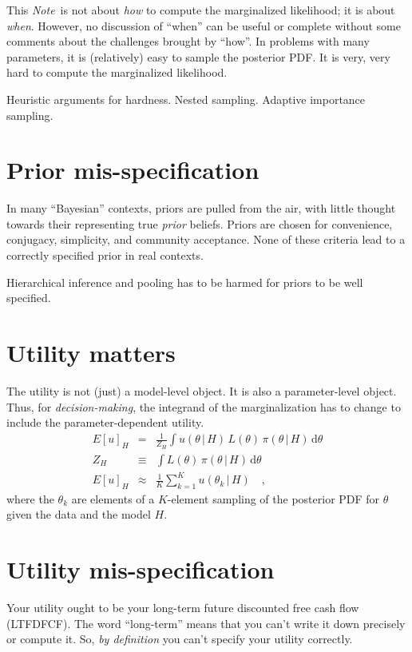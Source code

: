\documentclass[12pt]{article}
\newcommand{\documentname}{\textsl{Note}}
\newcommand{\dd}{\mathrm{d}}
\newcommand{\given}{\,|\,}
\begin{document}
This \documentname\ is not about \emph{how} to compute the marginalized likelihood;
  it is about \emph{when}.
However, no discussion of ``when'' can be useful or complete without some comments
  about the challenges brought by ``how''.
In problems with many parameters, it is (relatively) easy to sample the posterior PDF.
It is very, very hard to compute the marginalized likelihood.

Heuristic arguments for hardness.
Nested sampling.
Adaptive importance sampling.

\section{Prior mis-specification}

In many ``Bayesian'' contexts, priors are pulled from the air,
  with little thought towards their representing true \emph{prior} beliefs.
Priors are chosen for convenience, conjugacy, simplicity, and community acceptance.
None of these criteria lead to a correctly specified prior in real contexts.

Hierarchical inference and pooling has to be harmed for priors to be well specified.

\section{Utility matters}

The utility is not (just) a model-level object.
It is also a parameter-level object.
Thus, for \emph{decision-making},
  the integrand of the marginalization has to change to include the parameter-dependent utility.
\begin{eqnarray}
E[u]_H &=& \frac{1}{Z_H} \int u(\theta\given H)\,L(\theta)\,\pi(\theta\given H)\,\dd\theta
\\
Z_H &\equiv& \int L(\theta)\,\pi(\theta\given H)\,\dd\theta
\\
E[u]_H &\approx& \frac{1}{K} \sum_{k=1}^K u(\theta_k\given H)
\quad ,
\end{eqnarray}
where the $\theta_k$ are elements of a $K$-element sampling of the
posterior PDF for $\theta$ given the data and the model $H$.

\section{Utility mis-specification}

Your utility ought to be your long-term future discounted free cash flow (LTFDFCF).
The word ``long-term'' means that you can't write it down precisely or compute it.
So, \emph{by definition} you can't specify your utility correctly.
\end{document}

